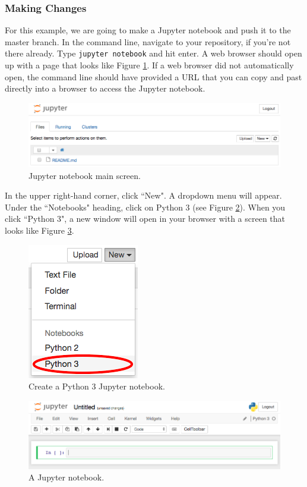 \documentclass[11pt,a4paper]{article}
\begin{document}
\subsubsection*{Making Changes}
For this example, we are going to make a Jupyter notebook and push it to the master branch.
In the command line, navigate to your repository, if you're not there already.
Type \texttt{jupyter notebook} and hit enter.
A web browser should open up with a page that looks like Figure \ref{fig:jupyter-dir}.
If a web browser did not automatically open, the command line should have provided a URL that you can copy and past directly into a browser to access the Jupyter notebook.

\begin{figure}[h]
\centering
\includegraphics[width=.7\textwidth]{figures/jupyter_dir.png}
\caption{Jupyter notebook main screen.}
\label{fig:jupyter-dir}
\end{figure}

In the upper right-hand corner, click ``New".
A dropdown menu will appear.
Under the ``Notebooks" heading, click on Python 3 (see Figure \ref{fig:jupyter-dropdown}).
When you click ``Python 3", a new window will open in your browser with a screen that looks like Figure \ref{fig:jupyter}.

\begin{figure}[h]
\centering
\includegraphics[width=.3\textwidth]{figures/jupyter_dropdown.png}
\caption{Create a Python 3 Jupyter notebook.}
\label{fig:jupyter-dropdown}
\end{figure}

\begin{figure}[h]
\centering
\includegraphics[width=.7\textwidth]{figures/jupyter.png}
\caption{A Jupyter notebook.}
\label{fig:jupyter}
\end{figure}
\end{document}
